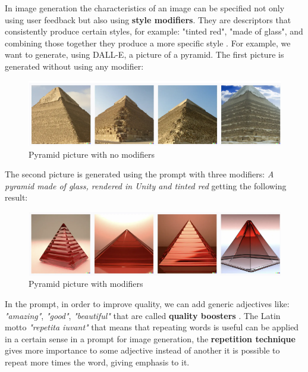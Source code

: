 In image generation the characteristics of an image can be specified not only using user feedback but also using \textbf{style modifiers}.
They are descriptors that consistently produce certain styles, for example: "tinted red", "made of glass", and combining those together they produce a more specific style \cite{lp_style}.
For example, we want to generate, using DALL-E, a picture of a pyramid.
The first picture is generated without using any modifier:
\begin{figure}[H]
    \centering
    \includegraphics[width=0.9\linewidth]{Figures/fig_11.png}
    \caption{Pyramid picture with no modifiers}
    \label{fig:11}
\end{figure}
The second picture is generated using the prompt with three modifiers: \textit{A pyramid made of glass, rendered in Unity and tinted red} getting the following result:
\begin{figure}[H]
    \centering
    \includegraphics[width=0.9\linewidth]{Figures/fig_12.png}
    \caption{Pyramid picture with modifiers}
    \label{fig:12}
\end{figure}
In the prompt, in order to improve quality, we can add generic adjectives like: \textit{"amazing"}, \textit{"good"}, \textit{"beautiful"} that are called \textbf{quality boosters} \cite{oppenlaender2023taxonomy}.
The Latin motto \textit{"repetita iuvant"} that means that repeating words is useful can be applied in a certain sense in a prompt for image generation, the \textbf{repetition technique} gives more importance to some adjective instead of another it is possible to repeat more times the word, giving emphasis to it.

